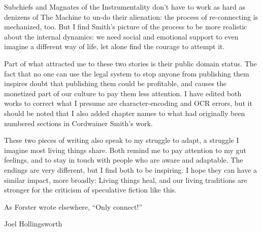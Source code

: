 Subchiefs and Magnates of the Instrumentality don't have to work as hard as denizens of The Machine to un-do their alienation: the process of re-connecting is mechanized, too. But I find Smith's picture of the process to be more realistic about the internal dynamics: we need social and emotional support to even imagine a different way of life, let alone find the courage to attempt it.

Part of what attracted me to these two stories is their public domain status. The fact that no one can use the legal system to stop anyone from publishing them inspires doubt that publishing them could be profitable, and causes the monetized part of our culture to pay them less attention. I have edited both works to correct what I presume are character-encoding and OCR errors, but it should be noted that I also added chapter names to what had originally been numbered sections in Cordwainer Smith's work.

These two pieces of writing also speak to my struggle to adapt, a struggle I imagine most living things share. Both remind me to pay attention to my gut feelings, and to stay in touch with people who are aware and adaptable. The endings are very different, but I find both to be inspiring. I hope they can have a similar impact, more broadly: Living things heal, and our living traditions are stronger for the criticism of speculative fiction like this.

As Forster wrote elsewhere, ``Only connect!''

Joel Hollingsworth
